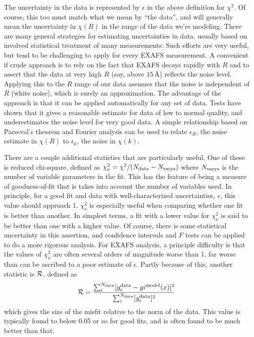 The uncertainty in the data is represented by $\epsilon$ in the above
definition for $\chi^2$.  Of course, this too must match what we mean by
``the data'', and will generally mean the uncertainty in $\chi(R)$ in the
range of the data we're modeling.  There are many general strategies for
estimating uncertainties in data, usually based on involved statistical
treatment of many measurements.  Such efforts are very useful, but tend to
be challenging to apply for every EXAFS measurement.  A convenient if crude
approach is to rely on the fact that EXAFS decays rapidly with $R$ and to
assert that the data at very high $R$ (say, above $15\, \text{\AA}$) reflects
the noise level.  Applying this to the $R$ range of our data assumes that
the noise is independent of $R$ (white noise), which is surely an
approximation.  The advantage of the approach is that it can be applied
automatically for any set of data.  Tests have shown that it gives a
reasonable estimate for data of low to normal quality, and underestimates
the noise level for very good data.  A simple relationship based on
Parseval's theorem and Fourier analysis can be used to relate $\epsilon_R$,
the noise estimate in $\chi(R)$ to $\epsilon_k$, the noise in $\chi(k)$\cite{NewvilleBoyanov}.

There are a couple additional statistics that are particularly useful\cite{StandCrit}.  One
of these is reduced chi-square, defined as $\chi^2_{\nu} = \chi^2 / (N_{\rm
  data} - N_{\rm varys})$ where $N_{\rm varys}$ is the number of variable
parameters in the fit.  This has the feature of being a measure of
goodness-of-fit that is takes into account the number of variables used.
In principle, for a good fit and data with well-characterized
uncertainties, $\epsilon$, this value should approach 1.  $\chi^2_{\nu}$ is
especially useful when comparing whether one fit is better than another.  In
simplest terms, a fit with a lower value for $\chi^2_{\nu}$ is said to be
better than one with a higher value.  Of course, there is some statistical
uncertainty in this assertion, and confidence intervals and $F$ tests can
be applied to do a more rigorous analysis.  For EXAFS analysis, a principle
difficulty is that the values of $\chi^2_{\nu}$ are often several orders of
magnitude worse than 1, far worse than can be ascribed to a poor estimate
of $\epsilon$.  Partly because of this, another statistic is $\cal{R}$,
defined as
\begin{equation}
  {\cal{R}} = \frac{\sum_i^{N_{\rm data}}[y_i^{\rm data} -
    yi^{\rm model}({x})]^2 }{
    \sum_i^{N_{\rm data}} [{y_i^{\rm data}}]^2}
  \label{Eq:FIT:rfactor}
\end{equation}
\noindent
which gives the size of the misfit relative to the norm of the data.  This
value is typically found to below 0.05 or so for good fits, and is often
found to be much better than that.

